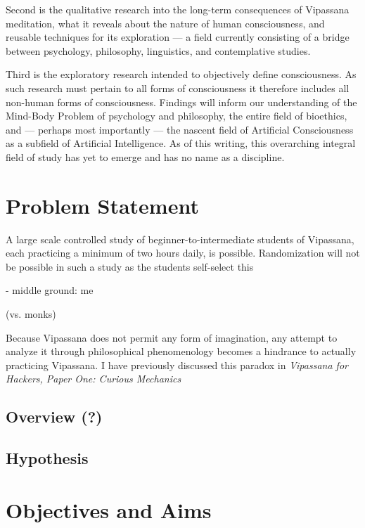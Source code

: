 \documentclass[a4paper, amsfonts, amssymb, amsmath, reprint, showkeys, nofootinbib, twoside]{revtex4-1}
\begin{document}
Second is the qualitative research into the long-term consequences of
Vipassana meditation, what it reveals about the nature of human consciousness, and
reusable techniques for its exploration --- a field currently consisting of a bridge
between psychology, philosophy, linguistics, and contemplative studies.

Third is the exploratory research intended to objectively define
consciousness. As such research must pertain to all forms of consciousness it
therefore includes all non-human forms of consciousness. Findings will inform our
understanding of the Mind-Body Problem of psychology and philosophy, the entire field
of bioethics, and --- perhaps most importantly --- the nascent field of Artificial
Consciousness as a subfield of Artificial Intelligence. \cite{hildt2019artificial} As of this
writing, this overarching integral field of study has yet to emerge and has no name
as a discipline.

\section{Problem Statement}

A large scale controlled study of beginner-to-intermediate
students of Vipassana, each practicing a minimum of two hours daily, is
possible. Randomization will not be possible in such a study as the students
self-select this

- middle ground: me

(vs. monks)

Because Vipassana does not permit any form of imagination, any attempt to analyze it
through philosophical phenomenology becomes a hindrance to actually practicing
Vipassana. \cite{patrik1994phenomenological} I have previously discussed this paradox
in \textit{Vipassana for Hackers, Paper One: Curious Mechanics} \cite{deobald2017curious}

\subsection{Overview (?)}
\subsection{Hypothesis}

\section{Objectives and Aims}
\end{document}
